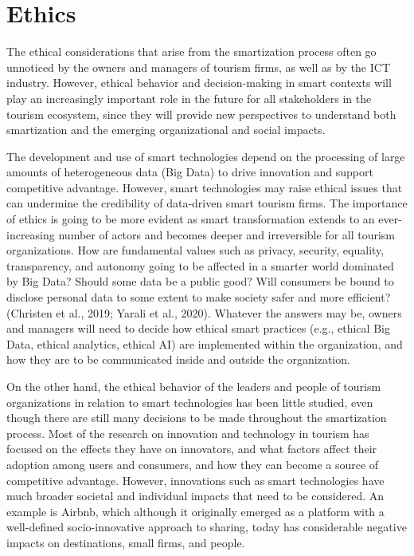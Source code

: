 \documentclass[
  letterpaper,
  DIV=11,
  numbers=noendperiod]{scrreprt}
\begin{document}
\hypertarget{ethics}{%
\section{Ethics}\label{ethics}}

The ethical considerations that arise from the smartization process
often go unnoticed by the owners and managers of tourism firms, as well
as by the ICT industry. However, ethical behavior and decision-making in
smart contexts will play an increasingly important role in the future
for all stakeholders in the tourism ecosystem, since they will provide
new perspectives to understand both smartization and the emerging
organizational and social impacts.

The development and use of smart technologies depend on the processing
of large amounts of heterogeneous data (Big Data) to drive innovation
and support competitive advantage. However, smart technologies may raise
ethical issues that can undermine the credibility of data-driven smart
tourism firms. The importance of ethics is going to be more evident as
smart transformation extends to an ever-increasing number of actors and
becomes deeper and irreversible for all tourism organizations. How are
fundamental values such as privacy, security, equality, transparency,
and autonomy going to be affected in a smarter world dominated by Big
Data? Should some data be a public good? Will consumers be bound to
disclose personal data to some extent to make society safer and more
efficient? (Christen et al., 2019; Yarali et al., 2020). Whatever the
answers may be, owners and managers will need to decide how ethical
smart practices (e.g., ethical Big Data, ethical analytics, ethical AI)
are implemented within the organization, and how they are to be
communicated inside and outside the organization.

On the other hand, the ethical behavior of the leaders and people of
tourism organizations in relation to smart technologies has been little
studied, even though there are still many decisions to be made
throughout the smartization process. Most of the research on innovation
and technology in tourism has focused on the effects they have on
innovators, and what factors affect their adoption among users and
consumers, and how they can become a source of competitive advantage.
However, innovations such as smart technologies have much broader
societal and individual impacts that need to be considered. An example
is Airbnb, which although it originally emerged as a platform with a
well-defined socio-innovative approach to sharing, today has
considerable negative impacts on destinations, small firms, and people.
\end{document}
